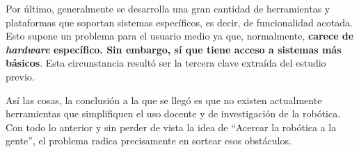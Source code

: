 Por último, generalmente se desarrolla una gran cantidad de herramientas y plataformas que soportan sistemas específicos, es decir, de funcionalidad acotada. Esto supone un problema para el usuario medio ya que, normalmente, \textbf{carece de \textit{hardware} específico. Sin embargo, sí que tiene acceso a sistemas más básicos}. Esta circunstancia resultó ser la tercera clave extraída del estudio previo.

Así las cosas, la conclusión a la que se llegó es que no existen actualmente herramientas que simplifiquen el uso docente y de investigación de la robótica. Con todo lo anterior y sin perder de vista la idea de ``Acercar la robótica a la gente'', el problema radica precisamente en sortear esos obstáculos.
